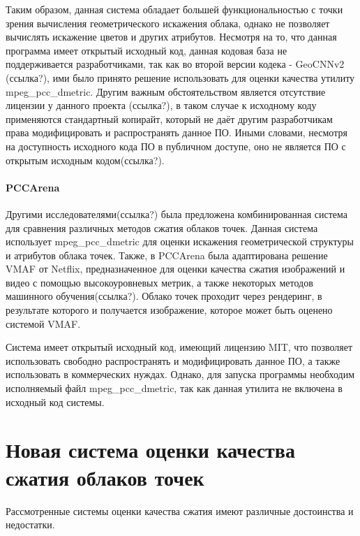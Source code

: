 Таким образом, данная система обладает большей функциональностью с точки зрения
вычисления геометрического искажения облака, однако не позволяет вычислять
искажение цветов и других атрибутов. Несмотря на то, что данная программа имеет
открытый исходный код, данная кодовая база не поддерживается разработчиками, так
как во второй версии кодека - GeoCNNv2 (ссылка?), ими было принято решение
использовать для оценки качества утилиту mpeg\_pcc\_dmetric. Другим важным
обстоятельством является отсутствие лицензии у данного проекта (ссылка?), в
таком случае к исходному коду применяются стандартный копирайт, который не даёт
другим разработчикам права модифицировать и распространять данное ПО. Иными
словами, несмотря на доступность исходного кода ПО в публичном доступе, оно не
является ПО с открытым исходным кодом(ссылка?).

\paragraph{PCCArena}

Другими исследователями(ссылка?) была предложена комбинированная система для
сравнения различных методов сжатия облаков точек. Данная система использует
mpeg\_pcc\_dmetric для оценки искажения геометрической структуры и атрибутов
облака точек. Также, в PCCArena была адаптирована решение VMAF от Netflix,
предназначенное для оценки качества сжатия изображений и видео с помощью
высокоуровневых метрик, а также некоторых методов машинного обучения(ссылка?).
Облако точек проходит через рендеринг, в результате которого и получается
изображение, которое может быть оценено системой VMAF.

Система имеет открытый исходный код, имеющий лицензию MIT, что позволяет
использовать свободно распространять и модифицировать данное ПО, а также
использовать в коммерческих нуждах. Однако, для запуска программы необходим
исполняемый файл mpeg\_pcc\_dmetric, так как данная утилита не включена в
исходный код системы.

\section{Новая система оценки качества сжатия облаков точек}

Рассмотренные системы оценки качества сжатия имеют различные достоинства и
недостатки.

